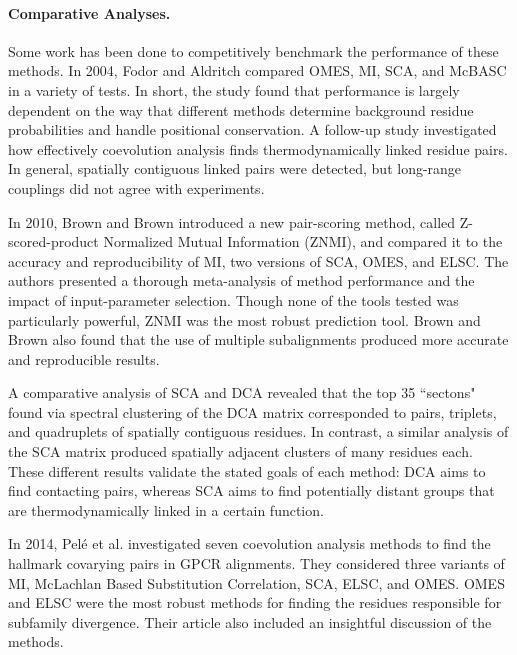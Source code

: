 \paragraph{Comparative Analyses.} Some work has been done to competitively benchmark the performance of these methods. In 2004, Fodor and Aldritch compared OMES, MI, SCA, and McBASC in a variety of tests. In short, the study found that performance is largely dependent on the way that different methods determine background residue probabilities and handle positional conservation.\cite{Fodor2004a} A follow-up study investigated how effectively coevolution analysis finds thermodynamically linked residue pairs.\cite{Fodor2004c} In general, spatially contiguous linked pairs were detected, but long-range couplings did not agree with experiments.
\par In 2010, Brown and Brown introduced a new pair-scoring method, called Z-scored-product Normalized Mutual Information (ZNMI), and compared it to the accuracy and reproducibility of MI, two versions of SCA, OMES, and ELSC.\cite{Brown2010a} The authors presented a thorough meta-analysis of method performance and the impact of input-parameter selection. Though none of the tools tested was particularly powerful, ZNMI was the most robust prediction tool. Brown and Brown also found that the use of multiple subalignments produced more accurate and reproducible results.
\par A comparative analysis of SCA and DCA revealed that the top 35 ``sectons" found via spectral clustering of the DCA matrix corresponded to pairs, triplets, and quadruplets of spatially contiguous residues.\cite{Rivoire2013a} In contrast, a similar analysis of the SCA matrix produced spatially adjacent clusters of many residues each. These different results validate the stated goals of each method: DCA aims to find contacting pairs, whereas SCA aims to find potentially distant groups that are thermodynamically linked in a certain function.
\par In 2014, Pel\'{e} et al. investigated seven coevolution analysis methods to find the hallmark covarying pairs in GPCR alignments.\cite{Pele2014a} They considered three variants of MI, McLachlan Based Substitution Correlation, SCA, ELSC, and OMES. OMES and ELSC were the most robust methods for finding the residues responsible for subfamily divergence. Their article also included an insightful discussion of the methods.
